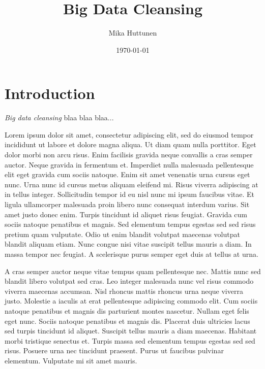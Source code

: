 \documentclass[british, twocolumn]{tktltiki2}
\title{Big Data Cleansing}
\author{Mika Huttunen}
\date{\today}
\theoremstyle{definition}
\theoremstyle{remark}
\begin{document}

\frontmatter      %

\maketitle        %
\makeabstract     %

\tableofcontents  %


\mainmatter       %


\section{Introduction}

\textit{Big data cleansing} blaa blaa blaa... \cite{rahm2000}

Lorem ipsum dolor sit amet, consectetur adipiscing elit, sed do eiusmod tempor incididunt ut labore et dolore magna aliqua. Ut diam quam nulla porttitor. Eget dolor morbi non arcu risus. Enim facilisis gravida neque convallis a cras semper auctor. Neque gravida in fermentum et. Imperdiet nulla malesuada pellentesque elit eget gravida cum sociis natoque. Enim sit amet venenatis urna cursus eget nunc. Urna nunc id cursus metus aliquam eleifend mi. Risus viverra adipiscing at in tellus integer. Sollicitudin tempor id eu nisl nunc mi ipsum faucibus vitae. Et ligula ullamcorper malesuada proin libero nunc consequat interdum varius. Sit amet justo donec enim. Turpis tincidunt id aliquet risus feugiat. Gravida cum sociis natoque penatibus et magnis. Sed elementum tempus egestas sed sed risus pretium quam vulputate. Odio ut enim blandit volutpat maecenas volutpat blandit aliquam etiam. Nunc congue nisi vitae suscipit tellus mauris a diam. In massa tempor nec feugiat. A scelerisque purus semper eget duis at tellus at urna.

A cras semper auctor neque vitae tempus quam pellentesque nec. Mattis nunc sed blandit libero volutpat sed cras. Leo integer malesuada nunc vel risus commodo viverra maecenas accumsan. Nisl rhoncus mattis rhoncus urna neque viverra justo. Molestie a iaculis at erat pellentesque adipiscing commodo elit. Cum sociis natoque penatibus et magnis dis parturient montes nascetur. Nullam eget felis eget nunc. Sociis natoque penatibus et magnis dis. Placerat duis ultricies lacus sed turpis tincidunt id aliquet. Suscipit tellus mauris a diam maecenas. Habitant morbi tristique senectus et. Turpis massa sed elementum tempus egestas sed sed risus. Posuere urna nec tincidunt praesent. Purus ut faucibus pulvinar elementum. Vulputate mi sit amet mauris.
\end{document}
